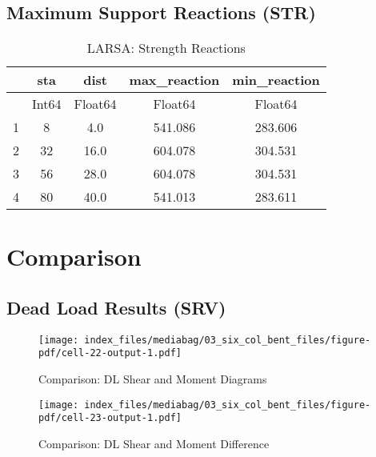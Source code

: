 \documentclass[
  letterpaper,
  DIV=11,
  numbers=noendperiod]{scrreprt}
\begin{document}
\subsection{Maximum Support Reactions
(STR)}\label{maximum-support-reactions-str-3}

\begin{table}
\caption{LARSA: Strength Reactions}\tabularnewline

\centering
\begin{tabular}{r|cccc}
    & sta & dist & max\_reaction & min\_reaction\\
    \hline
    & Int64 & Float64 & Float64 & Float64\\
    \hline
    1 & 8 & 4.0 & 541.086 & 283.606 \\
    2 & 32 & 16.0 & 604.078 & 304.531 \\
    3 & 56 & 28.0 & 604.078 & 304.531 \\
    4 & 80 & 40.0 & 541.013 & 283.611 \\
\end{tabular}
\end{table}

\section{Comparison}\label{comparison-1}

\subsection{Dead Load Results (SRV)}\label{dead-load-results-srv-3}

\begin{figure}[H]

{\centering \texttt{[image: index\_files/mediabag/03\_six\_col\_bent\_files/figure-pdf/cell-22-output-1.pdf]}

}

\caption{Comparison: DL Shear and Moment Diagrams}

\end{figure}%

\begin{figure}[H]

{\centering \texttt{[image: index\_files/mediabag/03\_six\_col\_bent\_files/figure-pdf/cell-23-output-1.pdf]}

}

\caption{Comparison: DL Shear and Moment Difference}

\end{figure}%
\end{document}
